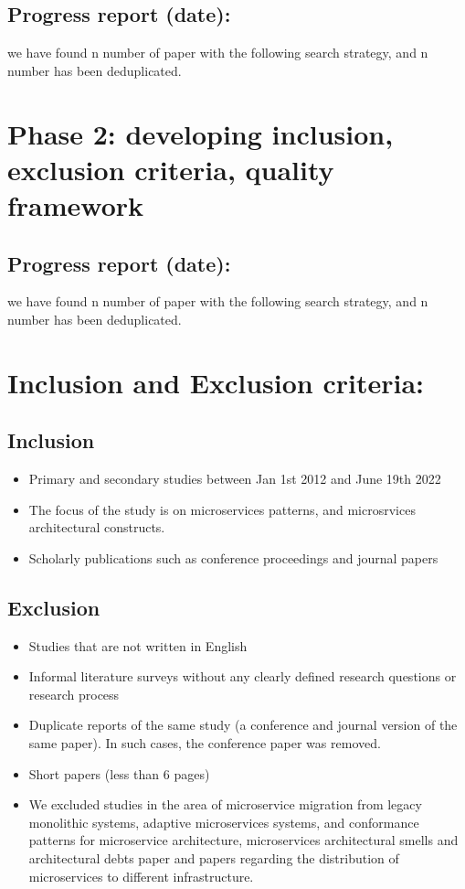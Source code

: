 \documentclass{article}
\theoremstyle{mytheoremstyle}
\theoremstyle{mytheoremstyle}
\theoremstyle{myproblemstyle}
\begin{document}
    \subsection{Progress report (date): }

     we have found n number of paper with the following search strategy, and n number has been deduplicated. 


     \section{Phase 2: developing inclusion, exclusion criteria, quality framework}

     \subsection{Progress report (date): }
 
      we have found n number of paper with the following search strategy, and n number has been deduplicated. 

      \section{Inclusion and Exclusion criteria:}

      \subsection{Inclusion}
      \begin{itemize}
        \item Primary and secondary studies between Jan 1st 2012 and June 19th 2022 
        \item The focus of the study is on microservices patterns, and microsrvices architectural constructs. 
        \item Scholarly publications such as conference proceedings and journal papers
      \end{itemize}

      \subsection{Exclusion}
      \begin{itemize}
        \item Studies that are not written in English
        \item Informal literature surveys without any clearly defined research questions or research process
        \item Duplicate reports of the same study (a conference and journal version of the same paper). In such cases, the conference paper was removed.
        \item Short papers (less than 6 pages)
        \item We excluded studies in the area of microservice migration from legacy monolithic systems, adaptive microservices systems, and conformance patterns for microservice architecture, microservices architectural smells and architectural debts paper and papers regarding the distribution of microservices to different infrastructure. 
      \end{itemize}
\end{document}
